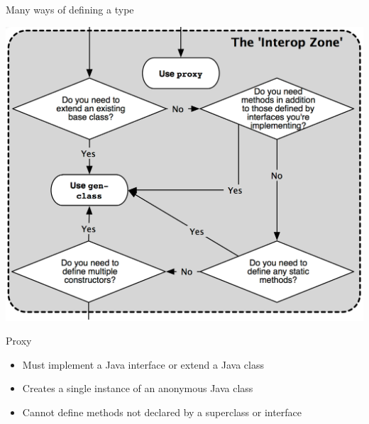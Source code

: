 \documentclass[xcolor=dvipsnames]{beamer}
\begin{document}
		\begin{frame}{Many ways of defining a type}
		\begin{center}
			\includegraphics[scale=.17]{choosingtypeformszoom.png}
		\end{center}
		\end{frame}
		

	
	\begin{frame}{Proxy}
	\begin{itemize}
	\item Must implement a Java interface or extend a Java class
	\item Creates a single instance of an anonymous Java class
	\item Cannot define methods not declared by a superclass or interface
	\end{itemize}
	\end{frame}	

	
\end{document}

